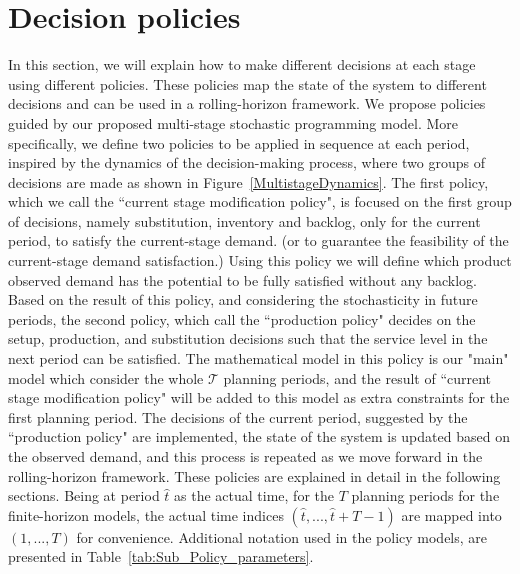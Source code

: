 \documentclass[10pt]{article}
\newcommand{\ti}{t} %
\newcommand{\TI}{\mathcal{T}}
\newcommand{\Ti}{T}
\newcommand{\tAct}{\hat{\ti}} %
\newcommand{\cred}{\color{red!65!black}}
\begin{document}
\section{Decision policies}

In this section, we will explain how to make different decisions at each stage using different policies. These policies map the state of the system to different decisions and can be used in a rolling-horizon framework. We propose policies guided by our proposed multi-stage stochastic programming model. 
More specifically, we define two policies to be applied in sequence at each period, inspired by the dynamics of the decision-making process, where two groups of decisions are made as shown in Figure~\ref{MultistageDynamics}. The first policy, which we call the ``current stage modification policy", is focused on the first group of decisions, namely substitution, inventory and backlog, only for the current period, to satisfy the current-stage demand. {\cred(or to guarantee the feasibility of the current-stage demand satisfaction.)} 
Using this policy we will define which product observed demand has the potential to be fully satisfied without any backlog. Based on the result of this policy, and considering the stochasticity in future periods, the second policy, which call the ``production policy" decides on the setup, production, and substitution decisions such that the service level in the next period can be satisfied. The mathematical model in this policy is our "main" model which consider the whole $\TI$ planning periods, and the result of ``current stage modification policy" will be added to this model as extra constraints for the first planning period.
The decisions of the current period, suggested by the ``production policy" are implemented, the state of the system is updated based on the observed demand, and this process is repeated as we move forward in the rolling-horizon framework. These policies are explained in detail in the following sections. Being at period $\tAct$ as the actual time, for the $\Ti$ planning periods for the finite-horizon models, the actual time indices $(\tAct, ..., \tAct +\Ti -1) $ are mapped into $(1, ..., \Ti)$ for convenience. Additional notation used in the policy models, are presented in Table~\ref{tab:Sub_Policy_parameters}. 
\end{document}
